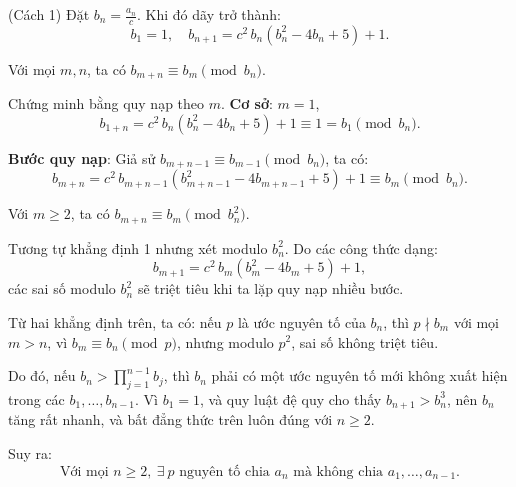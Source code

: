 \documentclass[../06-largest-exponent.tex]{subfiles}
\begin{document}
\begin{soln}(Cách 1)\footnotemark
    Đặt \( b_n = \frac{a_n}{c} \). Khi đó dãy trở thành:
    \[
        b_1 = 1,\quad b_{n+1} = c^2\,b_n(b_n^2 - 4b_n + 5) + 1.
    \]

    \begin{claim*}[1]
        Với mọi \(m,n\), ta có \(b_{m+n} \equiv b_m \pmod{b_n}\).
    \end{claim*}

    \begin{subproof}
        Chứng minh bằng quy nạp theo \(m\).  
        \textbf{Cơ sở}: \(m = 1\),
        \[
            b_{1+n} = c^2\,b_n(b_n^2 - 4b_n + 5) + 1 \equiv 1 = b_1 \pmod{b_n}.
        \]

        \textbf{Bước quy nạp}: Giả sử \(b_{m+n-1} \equiv b_{m-1} \pmod{b_n}\), ta có:
        \[
            b_{m+n} = c^2\,b_{m+n-1}(b_{m+n-1}^2 - 4b_{m+n-1} + 5) + 1 \equiv b_m \pmod{b_n}.
        \]
    \end{subproof}

    \begin{claim*}[2]
        Với \(m \ge 2\), ta có \(b_{m+n} \equiv b_m \pmod{b_n^2}\).
    \end{claim*}

    \begin{subproof}
        Tương tự khẳng định 1 nhưng xét modulo \(b_n^2\). Do các công thức dạng:
        \[
            b_{m+1} = c^2\,b_m(b_m^2 - 4b_m + 5) + 1,
        \]
        các sai số modulo \(b_n^2\) sẽ triệt tiêu khi ta lặp quy nạp nhiều bước.
    \end{subproof}

    Từ hai khẳng định trên, ta có: nếu \(p\) là ước nguyên tố của \(b_n\), thì \(p \nmid b_{m}\) với mọi \(m > n\), vì \(b_{m} \equiv b_n \pmod{p}\), nhưng modulo \(p^2\), sai số không triệt tiêu.

    Do đó, nếu \(b_n > \prod_{j=1}^{n-1} b_j\), thì \(b_n\) phải có một ước nguyên tố mới không xuất hiện trong các \(b_1,\dots,b_{n-1}\).  
    Vì \(b_1 = 1\), và quy luật đệ quy cho thấy \(b_{n+1} > b_n^3\), nên \(b_n\) tăng rất nhanh, và bất đẳng thức trên luôn đúng với \(n \ge 2\).

    Suy ra:
    \[
        \boxed{\text{Với mọi } n \ge 2,\ \exists\ p \text{ nguyên tố chia } a_n \text{ mà không chia } a_1,\dots,a_{n-1}.}
    \]
\end{soln}

\end{document}
